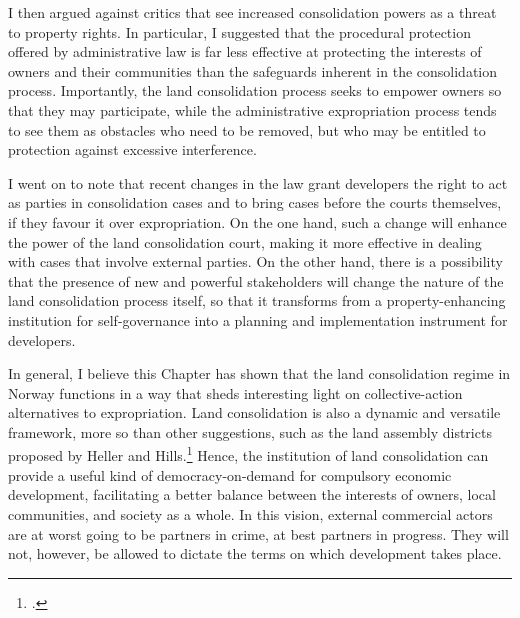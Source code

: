 I then argued against critics that see increased consolidation powers as a threat to property rights. In particular, I suggested that the procedural protection offered by administrative law is far less effective at protecting the interests of owners and their communities than the safeguards inherent in the consolidation process. Importantly, the land consolidation process seeks to empower owners so that they may participate, while the administrative expropriation process tends to see them as obstacles who need to be removed, but who may be entitled to protection against excessive interference.

I went on to note that recent changes in the law grant developers the right to act as parties in consolidation cases and to bring cases before the courts themselves, if they favour it over expropriation. On the one hand, such a change will enhance the power of the land consolidation court, making it more effective in dealing with cases that involve external parties. On the other hand, there is a possibility that the presence of new and powerful stakeholders will change the nature of the land consolidation process itself, so that it transforms from a property-enhancing institution for self-governance into a planning and implementation instrument for developers.

In general, I believe this Chapter has shown that the land consolidation regime in Norway functions in a way that sheds interesting light on collective-action alternatives to expropriation. Land consolidation is also a dynamic and versatile framework, more so than other suggestions, such as the land assembly districts proposed by Heller and Hills.\footcite{heller08} Hence, the institution of land consolidation can provide a useful kind of democracy-on-demand for compulsory economic development, facilitating a better balance between the interests of owners, local communities, and society as a whole. In this vision, external commercial actors are at worst going to be partners in crime, at best partners in progress. They will not, however, be allowed to dictate the terms on which development takes place.